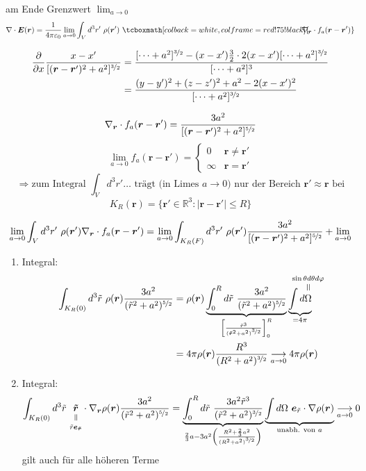 \documentclass[titlepage,11pt,a4paper,ngerman]{report}
\newcommand{\verteq}{\rotatebox{90}{$\,=$}}
\newcommand{\equalto}[2]{\underset{\scriptstyle\overset{\mkern4mu\verteq}{#2}}{#1}}
\newcommand{\equaltoup}[2]{\overset{\scriptstyle\underset{\mkern4mu\verteq}{#2}}{#1}}
\newcommand{\prt}[2]{\frac{\partial #1}{\partial #2}}
\newcommand{\kq}{\frac{1}{4\pi\epsilon_0}}
\newcommand{\intt}[2]{\int_{#1}^{#2}}
\renewcommand{\vec}[1]{\boldsymbol{#1}}
\renewcommand{\epsilon}{\varepsilon}
\newcommand{\rmbox}[1]{\tcboxmath[colback=white,colframe=red!75!black]{#1}}
\begin{document}
am Ende Grenzwert $\displaystyle{\lim_{a \to 0}}$
$$\nabla \cdot \vec{E} (\vec{r}) = \kq \lim_{a \to 0} \int_V d^3r'\ \rho(\vec{r}')\ \rmbox{\hspace{-10pt}\nabla_{\vec{r}}\cdot f_a(\vec{r}-\vec{r}')}$$

\begin{align*}
\prt{}{x} \frac{x-x'}{[(\vec{r}-\vec{r}')^2 + a^2]^{\nicefrac{3}{2}}} &= \frac{[\dots +a^2]^{\nicefrac{3}{2}} - (x - x') \frac{3}{2} \cdot 2(x-x') [\dots + a^2]^{\nicefrac{3}{2}}}{[\dots + a^2]^3}\\
&= \frac{(y - y')^2 + (z - z')^2 + a^2 - 2(x - x')^2}{[\dots + a^2]^{\nicefrac{3}{2}}}
\end{align*}

$$\nabla_{\vec{r}} \cdot f_a(\vec{r}-\vec{r}') = \frac{3a^2}{[(\vec{r}-\vec{r}')^2 + a^2]^{\nicefrac{5}{2}}}$$
$$\lim_{a \to 0} f_a(\vec{r}-\vec{r}') = \left\{ \begin{array}{cc}
0 & \vec{r} \neq \vec{r}'\\
\infty & \vec{r} = \vec{r}'	
\end{array} \right.$$
$$\Rightarrow \textrm{zum Integral } \int_V d^3r' \dots \textrm{ trägt (in Limes }a \to 0) \textrm{ nur der Bereich } \vec{r}' \approx \vec{r} \textrm{ bei}$$
$$K_R (\vec{r}) = \{\vec{r}' \in \mathbb R^3: |\vec{r} - \vec{r}'| \leq R\}$$

$$\lim_{a \to 0} \int_V d^3 r'\ \rho(\vec{r}') \nabla_{\vec{r}} \cdot f_a(\vec{r}- \vec{r}') = \lim_{a \to 0} \int_{K_R (F)} d^3 r' \ \rho(\vec{r}') \frac{3a^2}{[(\vec{r}-\vec{r}')^2 + a^2]^{\nicefrac{5}{2}}} + \lim_{a \to 0} $$ %




\begin{enumerate}
	\item Integral:
	\begin{align*}
	\int_{K_R (0)} d^3 \tilde r\ \rho(\vec{r}) \frac{3a^2}{(\tilde{r}^2 + a^2)^{\nicefrac{5}{2}}} &= \rho(\vec{r}) \underbrace{\intt{0}{R} d\tilde r\ \frac{3a^2}{(\tilde{r}^2 + a^2)^{\nicefrac{5}{2}}}}_{\left[\frac{\tilde r^3}{(\vec{\tilde{r}}^2 + a^2)^{\nicefrac{3}{2}}}\right]_0^R} \underbrace{\int d \equaltoup{\Omega}{\mathclap{\sin \theta d \theta d \varphi}}}_{= 4\pi}\\
	&= 4 \pi \rho(\vec{r}) \frac{R^3}{(R^2 + a^2)^{\nicefrac{3}{2}}} \underset{a \to 0}{\longrightarrow} 4 \pi \rho(\vec{r})
	\end{align*} 
	\item Integral:
	$$\int_{K_R (0)} d^3 \tilde{r}\ \equalto{\vec{\tilde{r}}}{\tilde{r}\vec{e}_{\vec{\tilde{r}}}} \cdot \nabla_{\vec{r}} \rho(\vec{r}) \frac{3 a^2}{(\tilde{r}^2 + a^2)^{\nicefrac{5}{2}}} = \underbrace{\intt{0}{R} d \tilde r\ \frac{3a^2 \tilde r^3}{(\tilde r^2 + a^2)^{\nicefrac{3}{2}}}}_{\frac{2}{3}a -3a^2 \left(\frac{R^2 +\frac{2}{3}a^2}{(R^2 + a^2)^{\nicefrac{3}{2}}}\right)} \underbrace{\int d \Omega\ \vec{e}_{\tilde{r}} \cdot \nabla \rho(\vec{r})}_{\textrm{unabh. von } a} \underset{a \to 0}{\longrightarrow} 0$$
	gilt auch für alle höheren Terme
\end{enumerate}
\end{document}
